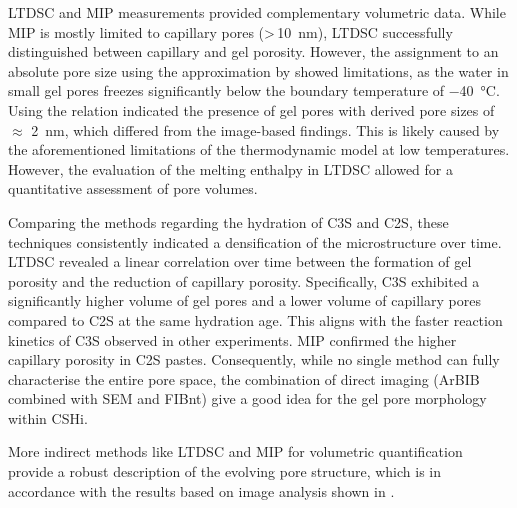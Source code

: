 \ac{LTDSC} and \ac{MIP} measurements provided complementary volumetric data.
While \ac{MIP} is mostly limited to capillary pores (>\,\qty{10}{\nano\meter}), \ac{LTDSC} successfully distinguished between capillary and gel porosity.
However, the assignment to an absolute pore size using the approximation by \textcite{brun.1977} showed limitations, as the water in small gel pores freezes significantly below the boundary temperature of \qty{-40}{\degreeCelsius}.
Using the \textcite{brun.1977} relation indicated the presence of gel pores with derived pore sizes of $\approx$ \qty{2}{\nano\meter}, which differed from the image-based findings.
This is likely caused by the aforementioned limitations of the thermodynamic model at low temperatures.
However, the evaluation of the melting enthalpy in \ac{LTDSC} allowed for a quantitative assessment of pore volumes.

Comparing the methods regarding the hydration of \ac{C3S} and \ac{C2S}, these techniques consistently indicated a densification of the microstructure over time.
\ac{LTDSC} revealed a linear correlation over time between the formation of gel porosity and the reduction of capillary porosity.
Specifically, \ac{C3S} exhibited a significantly higher volume of gel pores and a lower volume of capillary pores compared to \ac{C2S} at the same hydration age.
This aligns with the faster reaction kinetics of \ac{C3S} observed in other experiments.
\ac{MIP} confirmed the higher capillary porosity in \ac{C2S} pastes.
Consequently, while no single method can fully characterise the entire pore space, the combination of direct imaging (\ac{ArBIB} combined with \ac{SEM} and \ac{FIBnt}) give a good idea for the gel pore morphology within \ac*{CSHi}.

More indirect methods like \ac{LTDSC} and \ac{MIP} for volumetric quantification provide a robust description of the evolving pore structure, which is in accordance with the results based on image analysis shown in .

